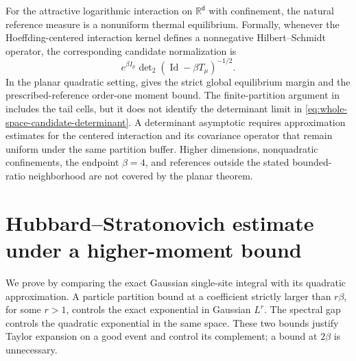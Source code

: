\documentclass[11pt,reqno]{amsart}
\numberwithin{equation}{section}
\theoremstyle{plain}
\theoremstyle{definition}
\renewcommand{\d}{\mathsf d}
\newcommand{\R}{\mathbb R}
\newcommand{\Id}{\operatorname{Id}}
\newcommand{\be}{\beta}
\begin{document}
For the attractive logarithmic interaction on $\R^{\d}$ with confinement, the natural reference measure is a nonuniform thermal equilibrium.  Formally, whenever the Hoeffding-centered interaction kernel defines a nonnegative Hilbert--Schmidt operator, the corresponding candidate normalization is
\begin{equation}
 e^{\be I_{\mu}}
 \det\nolimits_2(\Id-\be T_{\mu})^{-1/2}.
 \label{eq:whole-space-candidate-determinant}
\end{equation}
In the planar quadratic setting,  gives the strict global equilibrium margin and the prescribed-reference order-one moment bound. The finite-partition argument in  includes the tail cells, but it does not identify the determinant limit in \eqref{eq:whole-space-candidate-determinant}. A determinant asymptotic requires approximation estimates for the centered interaction and its covariance operator that remain uniform under the same partition buffer. Higher dimensions, nonquadratic confinements, the endpoint $\be=4$, and references outside the stated bounded-ratio neighborhood are not covered by the planar theorem.

\appendix

\section{Hubbard--Stratonovich estimate under a higher-moment bound}
\label{app:feature-laplace}

We prove  by comparing the exact Gaussian single-site integral with its quadratic approximation. A particle partition bound at a coefficient strictly larger than $r\be$, for some $r>1$, controls the exact exponential in Gaussian $L^r$. The spectral gap controls the quadratic exponential in the same space. These two bounds justify Taylor expansion on a good event and control its complement; a bound at $2\be$ is unnecessary.
\end{document}
